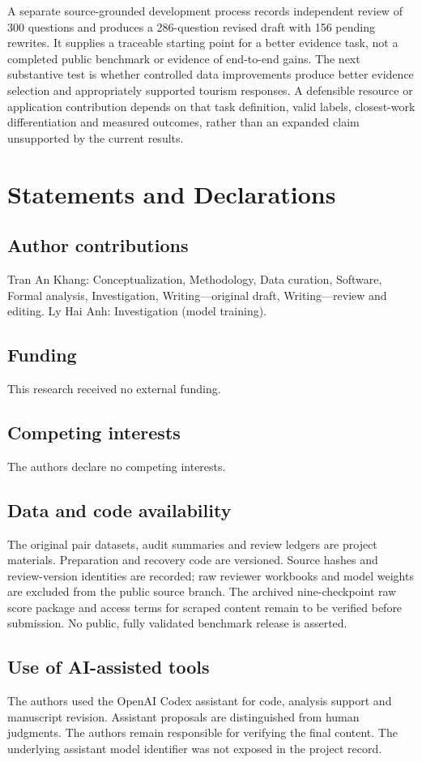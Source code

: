 \documentclass[preprint,12pt,authoryear]{elsarticle}
\begin{document}
A separate source-grounded development process records independent review of
300 questions and produces a 286-question revised draft with 156 pending
rewrites. It supplies a traceable starting point for a better evidence task,
not a completed public benchmark or evidence of end-to-end gains. The next
substantive test is whether controlled data improvements produce better evidence
selection and appropriately supported tourism responses. A defensible resource
or application contribution depends on that task definition, valid labels,
closest-work differentiation and measured outcomes, rather than an expanded
claim unsupported by the current results.

\section*{Statements and Declarations}
\subsection*{Author contributions}
Tran An Khang: Conceptualization, Methodology, Data curation, Software,
Formal analysis, Investigation, Writing---original draft, Writing---review
and editing. Ly Hai Anh: Investigation (model training).
\subsection*{Funding}
This research received no external funding.
\subsection*{Competing interests}
The authors declare no competing interests.
\subsection*{Data and code availability}
The original pair datasets, audit summaries and review ledgers are project
materials. Preparation and recovery code are versioned. Source hashes and
review-version identities are recorded; raw reviewer workbooks and model
weights are excluded from the public source branch. The archived nine-checkpoint
raw score package and access terms for scraped content remain to be verified
before submission. No public, fully validated benchmark release is asserted.
\subsection*{Use of AI-assisted tools}
The authors used the OpenAI Codex assistant for code, analysis support and
manuscript revision. Assistant proposals are distinguished from human judgments.
The authors remain responsible for verifying the final content. The underlying
assistant model identifier was not exposed in the project record.



\end{document}
